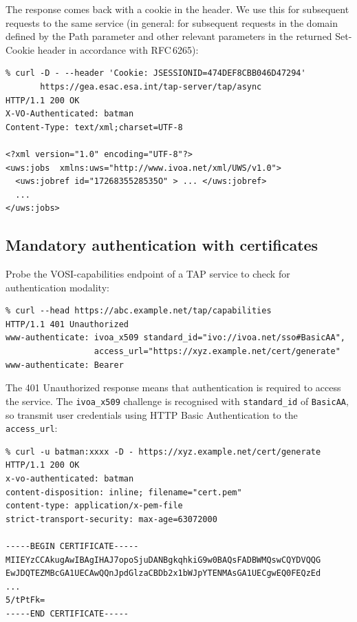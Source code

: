 \documentclass[11pt,a4paper]{ivoa}
\newcommand{\rfc}[1]{RFC\,#1}
\begin{document}
\noindent
The response comes back with a cookie in the header.
We use this for subsequent requests to the same service
(in general: for subsequent requests in the domain defined by the Path
parameter and other relevant parameters in the returned Set-Cookie header
in accordance with \rfc{6265}):
{\footnotesize
\begin{verbatim}
% curl -D - --header 'Cookie: JSESSIONID=474DEF8CBB046D47294'
       https://gea.esac.esa.int/tap-server/tap/async
HTTP/1.1 200 OK
X-VO-Authenticated: batman
Content-Type: text/xml;charset=UTF-8

<?xml version="1.0" encoding="UTF-8"?>
<uws:jobs  xmlns:uws="http://www.ivoa.net/xml/UWS/v1.0">
  <uws:jobref id="1726835528535O" > ... </uws:jobref>
  ...
</uws:jobs>
\end{verbatim}
}

\subsection{Mandatory authentication with certificates}


Probe the VOSI-capabilities endpoint of a TAP service to check
for authentication modality:
{\footnotesize
\begin{verbatim}
% curl --head https://abc.example.net/tap/capabilities
HTTP/1.1 401 Unauthorized
www-authenticate: ivoa_x509 standard_id="ivo://ivoa.net/sso#BasicAA",
                  access_url="https://xyz.example.net/cert/generate"
www-authenticate: Bearer
\end{verbatim}
}

\noindent
The 401 Unauthorized response means that authentication
is required to access the service.
The \verb|ivoa_x509| challenge is recognised with \verb|standard_id|
of \verb|BasicAA|, so transmit user credentials using
HTTP Basic Authentication to the \verb|access_url|:

{\footnotesize
\begin{verbatim}
% curl -u batman:xxxx -D - https://xyz.example.net/cert/generate
HTTP/1.1 200 OK
x-vo-authenticated: batman
content-disposition: inline; filename="cert.pem"
content-type: application/x-pem-file
strict-transport-security: max-age=63072000

-----BEGIN CERTIFICATE-----
MIIEYzCCAkugAwIBAgIHAJ7opoSjuDANBgkqhkiG9w0BAQsFADBWMQswCQYDVQQG
EwJDQTEZMBcGA1UECAwQQnJpdGlzaCBDb2x1bWJpYTENMAsGA1UECgwEQ0FEQzEd
...
5/tPtFk=
-----END CERTIFICATE-----
\end{verbatim}
}
\end{document}
